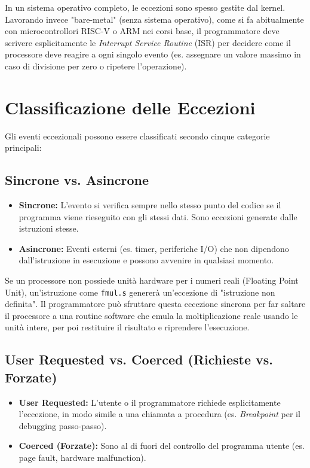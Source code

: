 \begin{remark}
In un sistema operativo completo, le eccezioni sono spesso gestite dal kernel. Lavorando invece "bare-metal" (senza sistema operativo), come si fa abitualmente con microcontrollori RISC-V o ARM nei corsi base, il programmatore deve scrivere esplicitamente le \textit{Interrupt Service Routine} (ISR) per decidere come il processore deve reagire a ogni singolo evento (es. assegnare un valore massimo in caso di divisione per zero o ripetere l'operazione).
\end{remark}

\section{Classificazione delle Eccezioni}
Gli eventi eccezionali possono essere classificati secondo cinque categorie principali:

\subsection{Sincrone vs. Asincrone}
\begin{itemize}
    \item \textbf{Sincrone:} L'evento si verifica sempre nello stesso punto del codice se il programma viene rieseguito con gli stessi dati. Sono eccezioni generate dalle istruzioni stesse.
    \item \textbf{Asincrone:} Eventi esterni (es. timer, periferiche I/O) che non dipendono dall'istruzione in esecuzione e possono avvenire in qualsiasi momento.
\end{itemize}
\begin{example}
Se un processore non possiede unità hardware per i numeri reali (Floating Point Unit), un'istruzione come \texttt{fmul.s} genererà un'eccezione di "istruzione non definita". Il programmatore può sfruttare questa eccezione sincrona per far saltare il processore a una routine software che emula la moltiplicazione reale usando le unità intere, per poi restituire il risultato e riprendere l'esecuzione.
\end{example}

\subsection{User Requested vs. Coerced (Richieste vs. Forzate)}
\begin{itemize}
    \item \textbf{User Requested:} L'utente o il programmatore richiede esplicitamente l'eccezione, in modo simile a una chiamata a procedura (es. \textit{Breakpoint} per il debugging passo-passo).
    \item \textbf{Coerced (Forzate):} Sono al di fuori del controllo del programma utente (es. page fault, hardware malfunction).
\end{itemize}

